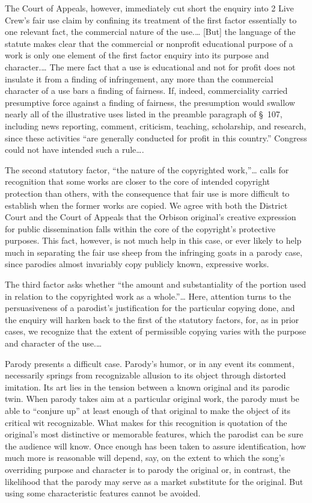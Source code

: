 The Court of Appeals, however, immediately cut short the enquiry into 2 Live
Crew's fair use claim by confining its treatment of the first factor essentially
to one relevant fact, the commercial nature of the use.\ldots
[But] the language of the statute makes clear that the commercial or nonprofit
educational purpose of a work is only one element of the first factor enquiry
into its purpose and character.\ldots
The mere fact that a use is educational and not for profit does
not insulate it from a finding of infringement, any more than the commercial
character of a use bars a finding of fairness. If, indeed, commerciality carried
presumptive force against a finding of fairness, the presumption would swallow
nearly all of the illustrative uses listed in the preamble paragraph of \S~107,
including news reporting, comment, criticism, teaching, scholarship, and
research, since these activities ``are generally conducted for profit in this
country.''
Congress could not have intended such a rule\ldots.


The second statutory factor, ``the nature of the copyrighted work,''\ldots
calls for
recognition that some works are closer to the core of intended copyright
protection than others, with the consequence that fair use is more difficult to
establish when the former works are copied. We agree with both the
District Court and the Court of Appeals that the Orbison original's creative
expression for public dissemination falls within the core of the copyright's
protective purposes. This fact,
however, is not much help in this case, or ever likely to help much in
separating the fair use sheep from the infringing goats in a parody case, since
parodies almost invariably copy publicly known, expressive works.



The third factor asks whether ``the amount and substantiality of the portion
used in relation to the copyrighted work as a whole.''\ldots
Here, attention turns to the persuasiveness of a parodist's
justification for the particular copying done, and the enquiry will harken back
to the first of the statutory factors, for, as in prior cases, we recognize that
the extent of permissible copying varies with the purpose and character of the
use.\ldots

Parody presents a
difficult case. Parody's humor, or in any event its comment, necessarily springs
from recognizable allusion to its object through distorted imitation. Its art
lies in the tension between a known original and its parodic twin. When parody
takes aim at a particular original work, the parody must be able to ``conjure
up'' at least enough of that original to make the object of its critical wit
recognizable. What makes for this
recognition is quotation of the original's most distinctive or memorable
features, which the parodist can be sure the audience will know. Once enough has
been taken to assure identification, how much more is reasonable will depend,
say, on the extent to which the song's overriding purpose and character is to
parody the original or, in contrast, the likelihood that the parody may serve as
a market substitute for the original. But using some characteristic features
cannot be avoided.

